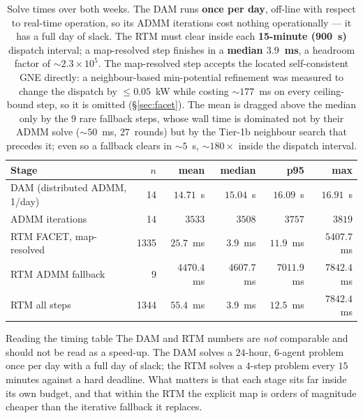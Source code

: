\documentclass[11pt, letterpaper]{article}
\begin{document}
\begin{table}[H]\centering
\begin{tabular}{lrrrrr}
\toprule
Stage & $n$ & mean & median & p95 & max\\
\midrule
DAM (distributed ADMM, 1/day) & 14 & $14.71$~s & $15.04$~s & $16.09$~s & $16.91$~s\\
\quad ADMM iterations         & 14 & $3533$ & $3508$ & $3757$ & $3819$\\
\midrule
RTM FACET, map-resolved       & 1335 & $25.7$~ms & $\mathbf{3.9}$~ms & $11.9$~ms & $5407.7$~ms\\
RTM ADMM fallback             & 9 & $4470.4$~ms & $4607.7$~ms & $7011.9$~ms & $7842.4$~ms\\
RTM all steps                 & 1344 & $55.4$~ms & $\mathbf{3.9}$~ms & $12.5$~ms & $7842.4$~ms\\
\bottomrule
\end{tabular}
\caption{Solve times over both weeks. The DAM runs \textbf{once per day}, off-line with respect to
real-time operation, so its ADMM iterations cost nothing operationally --- it has a full day of
slack. The RTM must clear inside each \textbf{15-minute (900~s)} dispatch interval; a map-resolved
step finishes in a \textbf{median $3.9$~ms}, a headroom factor of $\sim\!2.3\times10^{5}$. The
map-resolved step accepts the located self-consistent GNE directly: a neighbour-based
min-potential refinement was measured to change the dispatch by $\le0.05$~kW while costing
$\sim\!177$~ms on every ceiling-bound step, so it is omitted (\S\ref{sec:facet}). The mean is
dragged above the median only by the $9$ rare fallback steps, whose wall time is dominated not by
their ADMM solve ($\sim\!50$~ms, $27$~rounds) but by the Tier-1b neighbour search that precedes it;
even so a fallback clears in $\sim\!5$~s, $\sim\!180\times$ inside the dispatch interval.}
\label{tab:timing}
\end{table}

\begin{keybox}{Reading the timing table}
The DAM and RTM numbers are \emph{not} comparable and should not be read as a speed-up. The DAM
solves a $24$-hour, $6$-agent problem once per day with a full day of slack; the RTM solves a
$4$-step problem every $15$ minutes against a hard deadline. What matters is that each stage sits
far inside its own budget, and that within the RTM the explicit map is orders of magnitude cheaper
than the iterative fallback it replaces.
\end{keybox}
\end{document}

